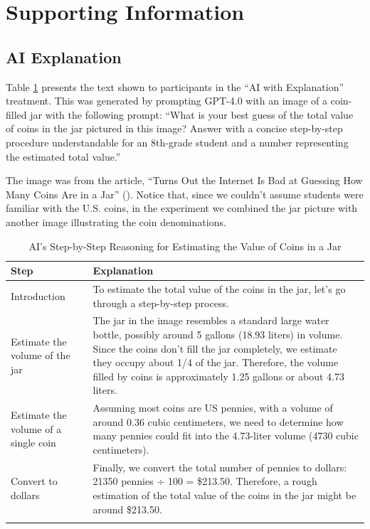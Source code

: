 \documentclass[
  11pt,
]{article}
\begin{document}
\clearpage
\processdelayedfloats
\clearpage
\appendix
\setcounter{table}{0}
\setcounter{figure}{0}
\renewcommand{\thetable}{A\arabic{table}}
\renewcommand{\thefigure}{A\arabic{figure}}

\section{Supporting Information}\label{supporting-information}

\subsection{AI Explanation}\label{sec:si-ai-explanation}

Table \ref{tab:explanation} presents the text shown to participants in the ``AI with Explanation'' treatment. This was generated by prompting GPT-4.0 with an image of a coin-filled jar with the following prompt: ``What is your best guess of the total value of coins in the jar pictured in this image? Answer with a concise step-by-step procedure understandable for an 8th-grade student and a number representing the estimated total value.''

The image was from the article, ``Turns Out the Internet Is Bad at Guessing How Many Coins Are in a Jar'' (). Notice that, since we couldn't assume students were familiar with the U.S. coins, in the experiment we combined the jar picture with another image illustrating the coin denominations.

\begin{table}

\caption{\label{tab:explanation}AI's Step-by-Step Reasoning for Estimating the Value of Coins in a Jar}
\centering
\begin{tabular}[t]{l>{\raggedright\arraybackslash}p{4in}}
\toprule
Step & Explanation\\
\midrule\arrayrulecolor{gray!20}
Introduction & To estimate the total value of the coins in the jar, let's go through a step-by-step process.\\
Estimate the volume of the jar & The jar in the image resembles a standard large water bottle, possibly around 5 gallons (18.93 liters) in volume. Since the coins don't fill the jar completely, we estimate they occupy about 1/4 of the jar. Therefore, the volume filled by coins is approximately 1.25 gallons or about 4.73 liters.\\
Estimate the volume of a single coin & Assuming most coins are US pennies, with a volume of around 0.36 cubic centimeters, we need to determine how many pennies could fit into the 4.73-liter volume (4730 cubic centimeters).\\
Convert to dollars & Finally, we convert the total number of pennies to dollars: 21350 pennies ÷ 100 = \$213.50. Therefore, a rough estimation of the total value of the coins in the jar might be around \$213.50.\\
\arrayrulecolor{black}\bottomrule
\end{tabular}
\end{table}
\newpage
\end{document}
